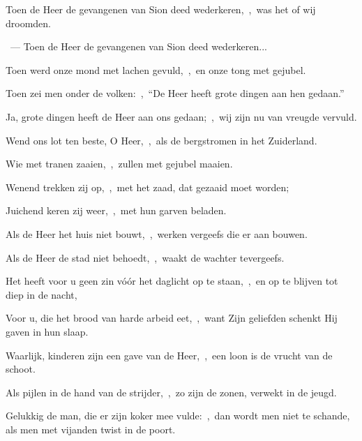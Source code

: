 \documentclass[12pt,twoside,a5paper]{article}
\begin{document}


\begin{halfparskip}

  Toen de Heer de gevangenen van Sion deed wederkeren,~\sep\ was het of wij droomden.

  ~---  Toen de Heer de gevangenen van Sion deed wederkeren...

  Toen werd onze mond met lachen gevuld,~\sep\ en onze tong met gejubel.

  Toen zei men onder de volken:~\sep\ ``De Heer heeft grote dingen aan hen gedaan.''

  Ja, grote dingen heeft de Heer aan ons gedaan;~\sep\ wij zijn nu van vreugde vervuld.
\end{halfparskip}

\begin{halfparskip}

  Wend ons lot ten beste, O Heer,~\sep\ als de bergstromen in het Zuiderland.

  Wie met tranen zaaien,~\sep\ zullen met gejubel maaien.

  Wenend trekken zij op,~\sep\ met het zaad, dat gezaaid moet worden;

  Juichend keren zij weer,~\sep\ met hun garven beladen.
\end{halfparskip}


\begin{halfparskip}

  Als de Heer het huis niet bouwt,~\sep\ werken vergeefs die er aan bouwen.

  Als de Heer de stad niet behoedt,~\sep\ waakt de wachter tevergeefs.

  Het heeft voor u geen zin vóór het daglicht op te staan,~\sep\ en op te blijven tot diep in de nacht,

  Voor u, die het brood van harde arbeid eet,~\sep\ want Zijn geliefden schenkt Hij gaven in hun slaap.
\end{halfparskip}

\begin{halfparskip}

  Waarlijk, kinderen zijn een gave van de Heer,~\sep\ een loon is de vrucht van de schoot.

  Als pijlen in de hand van de strijder,~\sep\ zo zijn de zonen, verwekt in de jeugd.

  Gelukkig de man, die er zijn koker mee vulde:~\sep\ dan wordt men niet te schande, als men met vijanden twist in de poort.
\end{halfparskip}
\end{document}
